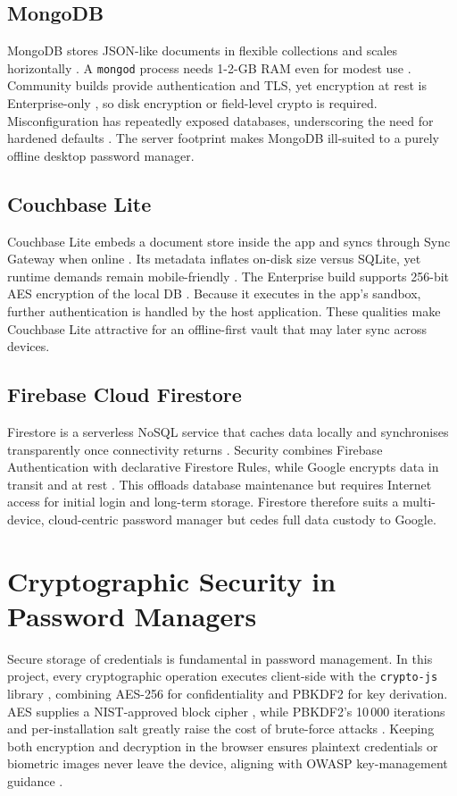 \subsection*{MongoDB}
MongoDB stores JSON-like documents in flexible collections and scales
horizontally \autocite{Miryala2024}.  A \texttt{mongod} process needs 1-2-GB
RAM even for modest use \autocite{Dahunsi2021}.  Community builds provide
authentication and TLS, yet encryption at rest is Enterprise-only
\autocite{PrismaMongoEnc, MongoDB2025}, so disk encryption or field-level
crypto is required.  Misconfiguration has repeatedly exposed databases,
underscoring the need for hardened defaults \autocite{SqlLite2025}.  The
server footprint makes MongoDB ill-suited to a purely offline desktop
password manager.

\subsection*{Couchbase Lite}
Couchbase Lite embeds a document store inside the app and syncs through
Sync Gateway when online \autocite{Pal2016}.  Its metadata inflates on-disk
size versus SQLite, yet runtime demands remain mobile-friendly
\autocite{Gkamas2022}.  The Enterprise build supports 256-bit AES encryption
of the local DB \autocite{CouchbaseEncryption, CouchbaseDoc2025}.  Because it
executes in the app's sandbox, further authentication is handled by the host
application.  These qualities make Couchbase Lite attractive for an
offline-first vault that may later sync across devices.

\subsection*{Firebase Cloud Firestore}
Firestore is a serverless NoSQL service that caches data locally and
synchronises transparently once connectivity returns \autocite{FirebaseDoc2025}.
Security combines Firebase Authentication with declarative Firestore Rules,
while Google encrypts data in transit and at rest \autocite{FirebaseSecurity2025}.
This offloads database maintenance but requires Internet access for initial
login and long-term storage.  Firestore therefore suits a multi-device,
cloud-centric password manager but cedes full data custody to Google.


\section{Cryptographic Security in Password Managers}
Secure storage of credentials is fundamental in password management.  
In this project, every cryptographic operation executes client-side with the
\texttt{crypto-js} library \autocite{CryptoJS2024}, combining AES-256 for
confidentiality and PBKDF2 for key derivation.  AES supplies a
NIST-approved block cipher \autocite{NISTFIPS197}, while PBKDF2's 10\,000
iterations and per-installation salt greatly raise the cost of brute-force
attacks \autocite{RFC8018}.  Keeping both encryption and decryption in the
browser ensures plaintext credentials or biometric images never leave the
device, aligning with OWASP key-management guidance
\textcite{OWASPKeyMgmt2025}.

